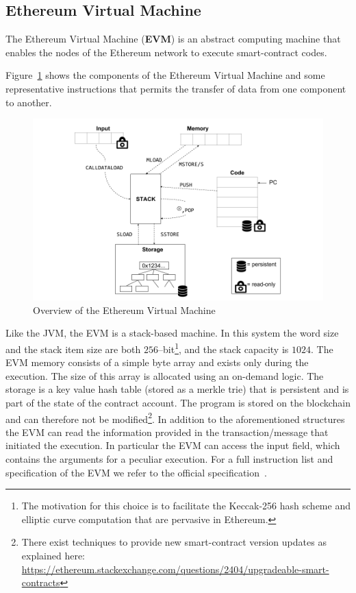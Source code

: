 \subsection{Ethereum Virtual Machine}
\label{sec:evm}
The Ethereum Virtual Machine (\textbf{EVM}) is an abstract computing machine
that enables the nodes of the Ethereum network to execute smart-contract
codes.

Figure~\ref{fig:evm} shows the components of the Ethereum Virtual Machine
and some representative instructions that permits the transfer of data
from one component to another.
\begin{figure}
	\begin{center}
		\includegraphics[width=\textwidth]
        {./res/img/architecture/evm/EVM.png}
	\end{center}
	\caption{Overview of the Ethereum Virtual Machine}
	\label{fig:evm}
\end{figure}
Like the JVM, the EVM is a stack-based machine. In this system the word size
and the stack item size are both $256$--bit\footnote{The motivation
for this choice is to facilitate the Keccak-256 hash scheme and elliptic
curve computation that are pervasive in Ethereum.},
and the stack capacity is $1024$.
The EVM memory consists of a simple byte array and exists only during the
execution. The size of this array is allocated using an on-demand logic.
The storage is a key value hash table (stored as a merkle trie) that is
persistent and is part of the state of the contract account.
The program is stored on the blockchain and can therefore not
be modified\footnote{There exist
techniques to provide new smart-contract version updates as explained
here:
\url{https://ethereum.stackexchange.com/questions/2404/upgradeable-smart-contracts}}.
In addition to the aforementioned structures the EVM can read the information
provided in the transaction/message that initiated the execution. In particular
the EVM can access the input field, which contains the arguments for a peculiar
execution.
For a full instruction list and specification of the EVM
we refer to the official specification~\cite{wood2018ethereum}.


